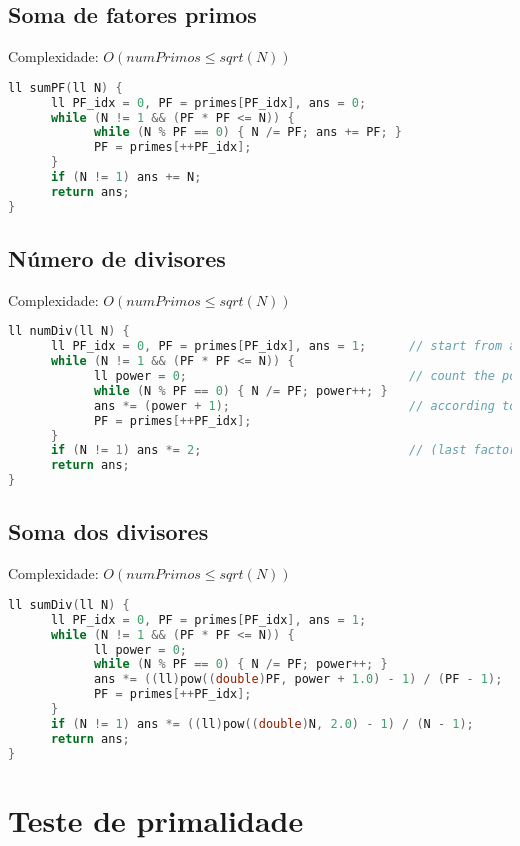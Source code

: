 \documentclass[12pt,a4paper,twoside]{report}
\begin{document}
\subsection{Soma de fatores primos}
Complexidade: $O(numPrimos \le sqrt(N))$
\noindent\begin{lstlisting}[caption=Soma de fatores primos,language=C++]
ll sumPF(ll N) {
      ll PF_idx = 0, PF = primes[PF_idx], ans = 0;
      while (N != 1 && (PF * PF <= N)) {
            while (N % PF == 0) { N /= PF; ans += PF; }
            PF = primes[++PF_idx];
      }
      if (N != 1) ans += N;
      return ans;
}
\end{lstlisting}

\subsection{Número de divisores}
Complexidade: $O(numPrimos \le sqrt(N))$
\noindent\begin{lstlisting}[caption=Número de divisores,language=C++]
ll numDiv(ll N) {
      ll PF_idx = 0, PF = primes[PF_idx], ans = 1;      // start from ans = 1
      while (N != 1 && (PF * PF <= N)) {
            ll power = 0;                               // count the power
            while (N % PF == 0) { N /= PF; power++; }
            ans *= (power + 1);                         // according to the formula
            PF = primes[++PF_idx];
      }
      if (N != 1) ans *= 2;                             // (last factor has pow = 1, we add 1 to it)
      return ans;
}
\end{lstlisting}

\subsection{Soma dos divisores}
Complexidade: $O(numPrimos \le sqrt(N))$
\noindent\begin{lstlisting}[caption=Soma dos divisores,language=C++]
ll sumDiv(ll N) {
      ll PF_idx = 0, PF = primes[PF_idx], ans = 1;                     // start from ans = 1
      while (N != 1 && (PF * PF <= N)) {
            ll power = 0;
            while (N % PF == 0) { N /= PF; power++; }
            ans *= ((ll)pow((double)PF, power + 1.0) - 1) / (PF - 1);  // formula
            PF = primes[++PF_idx];
      }
      if (N != 1) ans *= ((ll)pow((double)N, 2.0) - 1) / (N - 1);      // last one
      return ans;
}
\end{lstlisting}

\section{Teste de primalidade}
\end{document}
